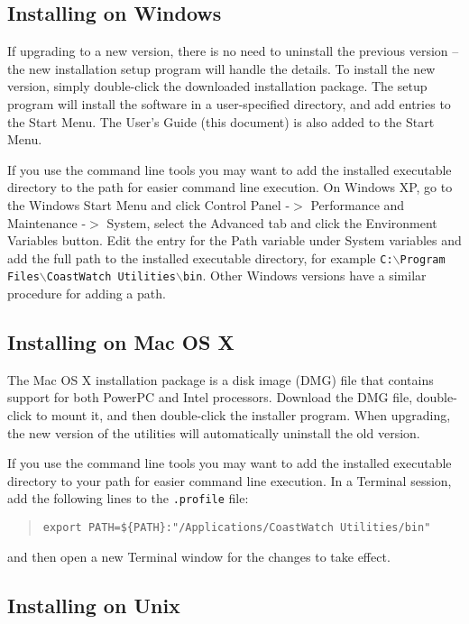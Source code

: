 \subsection{Installing on Windows}

If upgrading to a new version, there is no need to uninstall the
previous version -- the new installation setup program will handle
the details.  To install the new version, simply double-click the
downloaded installation package. The setup program will install the
software in a user-specified directory, and add entries to the Start
Menu.  The User's Guide (this document) is also added to the Start
Menu.

If you use the command line tools you may want to add the installed
executable directory to the path for easier command line execution.
On Windows XP, go to the Windows {\gui Start Menu} and click {\gui
Control Panel} -$>$ {\gui Performance and Maintenance} -$>$ {\gui
System}, select the {\gui Advanced} tab and click the {\gui Environment
Variables} button. Edit the entry for the {\gui Path} variable under
{\gui System variables} and add the full path to the installed
executable directory, for example {\tt C:$\backslash$Program
Files$\backslash$CoastWatch Utilities$\backslash$bin}. Other Windows
versions have a similar procedure for adding a path.

\subsection{Installing on Mac OS X}

The Mac OS X installation package is a disk image (DMG) file that
contains support for both PowerPC and Intel processors.  
Download the DMG file, double-click to mount it, and then
double-click the installer program.  When upgrading, the new version
of the utilities will automatically uninstall the old version.

If you use the command line tools you may want to add the installed
executable directory to your path for easier command line execution.
In a Terminal session, add the following lines to the {\tt .profile}
file:
\begin{quote}
  {\tt export PATH=\$\{PATH\}:"/Applications/CoastWatch Utilities/bin"}
\end{quote}
and then open a new Terminal window for the changes to take effect.

\subsection{Installing on Unix}

